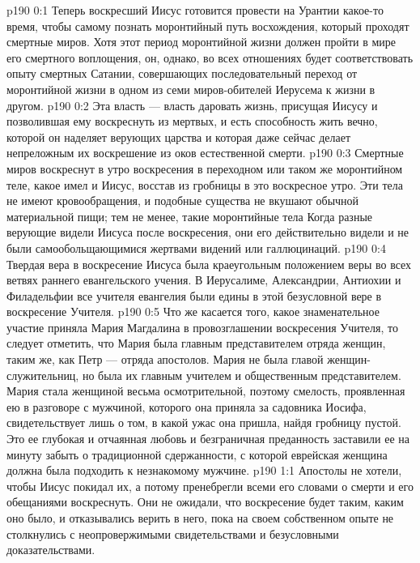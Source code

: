 \author{Комиссия срединников}
\vs p190 0:1 Теперь воскресший Иисус готовится провести на Урантии какое\hyp{}то время, чтобы самому познать моронтийный путь восхождения, который проходят смертные миров. Хотя этот период моронтийной жизни должен пройти в мире его смертного воплощения, он, однако, во всех отношениях будет соответствовать опыту смертных Сатании, совершающих последовательный переход от моронтийной жизни в одном из семи миров\hyp{}обителей Иерусема к жизни в другом.
\vs p190 0:2 Эта власть --- власть даровать жизнь, присущая Иисусу и позволившая ему воскреснуть из мертвых, и есть способность жить вечно, которой он наделяет верующих царства и которая даже сейчас делает непреложным их воскрешение из оков естественной смерти.
\vs p190 0:3 Смертные миров воскреснут в утро воскресения в переходном или таком же моронтийном теле, какое имел и Иисус, восстав из гробницы в это воскресное утро. Эти тела не имеют кровообращения, и подобные существа не вкушают обычной материальной пищи; тем не менее, такие моронтийные тела  Когда разные верующие видели Иисуса после воскресения, они его действительно видели и не были самообольщающимися жертвами видений или галлюцинаций.
\vs p190 0:4 Твердая вера в воскресение Иисуса была краеугольным положением веры во всех ветвях раннего евангельского учения. В Иерусалиме, Александрии, Антиохии и Филадельфии все учителя евангелия были едины в этой безусловной вере в воскресение Учителя.
\vs p190 0:5 \pc Что же касается того, какое знаменательное участие приняла Мария Магдалина в провозглашении воскресения Учителя, то следует отметить, что Мария была главным представителем отряда женщин, таким же, как Петр --- отряда апостолов. Мария не была главой женщин\hyp{}служительниц, но была их главным учителем и общественным представителем. Мария стала женщиной весьма осмотрительной, поэтому смелость, проявленная ею в разговоре с мужчиной, которого она приняла за садовника Иосифа, свидетельствует лишь о том, в какой ужас она пришла, найдя гробницу пустой. Это ее глубокая и отчаянная любовь и безграничная преданность заставили ее на минуту забыть о традиционной сдержанности, с которой еврейская женщина должна была подходить к незнакомому мужчине.
\vs p190 1:1 Апостолы не хотели, чтобы Иисус покидал их, а потому пренебрегли всеми его словами о смерти и его обещаниями воскреснуть. Они не ожидали, что воскресение будет таким, каким оно было, и отказывались верить в него, пока на своем собственном опыте не столкнулись с неопровержимыми свидетельствами и безусловными доказательствами.
